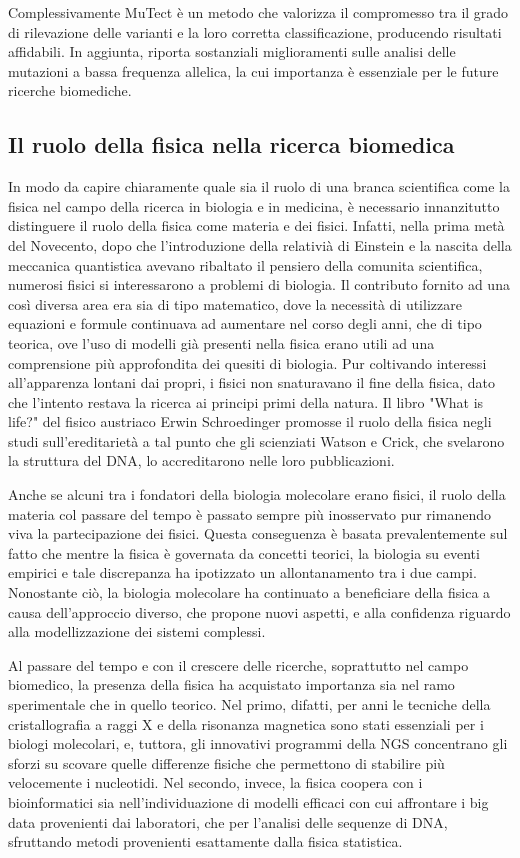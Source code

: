Complessivamente MuTect è un metodo che valorizza il compromesso tra il grado di rilevazione delle varianti e la loro corretta classificazione, producendo risultati affidabili.
In aggiunta, riporta sostanziali miglioramenti sulle analisi delle mutazioni a bassa frequenza allelica, la cui importanza è essenziale per le future ricerche biomediche.

\subsection{Il ruolo della fisica nella ricerca biomedica}
In modo da capire chiaramente quale sia il ruolo di una branca scientifica come la fisica nel campo della ricerca in biologia e in medicina, è necessario innanzitutto distinguere il ruolo della fisica come materia e dei fisici.
Infatti, nella prima metà del Novecento, dopo che l'introduzione della relativià di Einstein e la nascita della meccanica quantistica avevano ribaltato il pensiero della comunita scientifica, numerosi fisici si interessarono a problemi di biologia.
Il contributo fornito ad una così diversa area era sia di tipo matematico, dove la necessità di utilizzare equazioni e formule continuava ad aumentare nel corso degli anni, che di tipo teorica, ove l'uso di modelli già presenti nella fisica erano utili ad una comprensione più approfondita dei quesiti di biologia.
Pur coltivando interessi all'apparenza lontani dai propri, i fisici non snaturavano il fine della fisica, dato che l'intento restava la ricerca ai principi primi della natura.
Il libro "What is life?" del fisico austriaco Erwin Schroedinger promosse il ruolo della fisica negli studi sull'ereditarietà a tal punto che gli scienziati Watson e Crick, che svelarono la struttura del DNA, lo accreditarono nelle loro pubblicazioni.

Anche se alcuni tra i fondatori della biologia molecolare erano fisici, il ruolo della materia col passare del tempo è passato sempre più inosservato pur rimanendo viva la partecipazione dei fisici.
Questa conseguenza è basata prevalentemente sul fatto che mentre la fisica è governata da concetti teorici, la biologia su eventi empirici e tale discrepanza ha ipotizzato un allontanamento tra i due campi.
Nonostante ciò, la biologia molecolare ha continuato a beneficiare della fisica a causa dell'approccio diverso, che propone nuovi aspetti, e alla confidenza riguardo alla modellizzazione dei sistemi complessi.

Al passare del tempo e con il crescere delle ricerche, soprattutto nel campo biomedico, la presenza della fisica ha acquistato importanza sia nel ramo sperimentale che in quello teorico.
Nel primo, difatti, per anni le tecniche della cristallografia a raggi X e della risonanza magnetica sono stati essenziali per i biologi molecolari, e, tuttora, gli innovativi programmi della NGS concentrano gli sforzi su scovare quelle differenze fisiche che permettono di stabilire più velocemente i nucleotidi.
Nel secondo, invece, la fisica coopera con i bioinformatici sia nell'individuazione di modelli efficaci con cui affrontare i big data provenienti dai laboratori, che per l'analisi delle sequenze di DNA, sfruttando metodi provenienti esattamente dalla fisica statistica.

